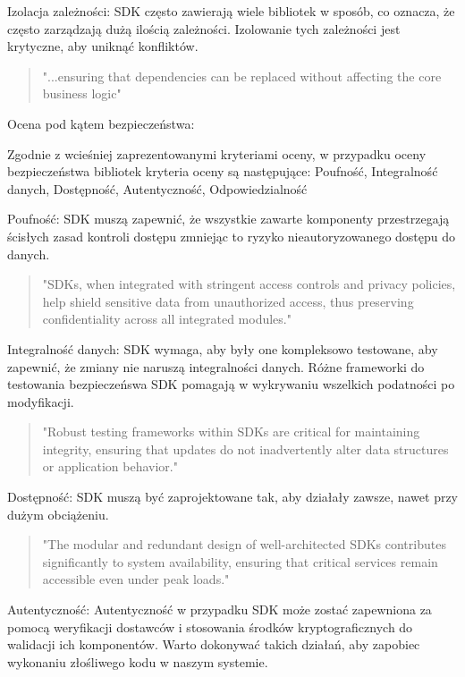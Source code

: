 \documentclass[runningheads,12pt]{llncs}
\begin{document}
Izolacja zależności: SDK często zawierają wiele bibliotek w sposób, co oznacza, że często zarządzają dużą ilością zależności. Izolowanie tych zależności jest krytyczne, aby uniknąć konfliktów.

\begin{quote}
    "...ensuring that dependencies can be replaced without affecting the core business logic" ~\cite[p. 218]{martin2008clean}
\end{quote}
Ocena pod kątem bezpieczeństwa: 

Zgodnie z wcieśniej zaprezentowanymi kryteriami oceny, w przypadku oceny bezpieczeństwa bibliotek kryteria oceny są następujące: Poufność, Integralność danych, Dostępność, Autentyczność, Odpowiedzialność

Poufność: SDK muszą zapewnić, że wszystkie zawarte komponenty przestrzegają ścisłych zasad kontroli dostępu zmniejąc to ryzyko nieautoryzowanego dostępu do danych.

\begin{quote}
    "SDKs, when integrated with stringent access controls and privacy policies, help shield sensitive data from unauthorized access, thus preserving confidentiality across all integrated modules." ~\cite[para 4]{azure2020}
\end{quote}

Integralność danych: SDK wymaga, aby były one kompleksowo testowane, aby zapewnić, że zmiany nie naruszą integralności danych. Różne frameworki do testowania bezpieczeńswa SDK pomagają w wykrywaniu wszelkich podatności po modyfikacji.

\begin{quote}
    "Robust testing frameworks within SDKs are critical for maintaining integrity, ensuring that updates do not inadvertently alter data structures or application behavior." ~\cite[para 5]{azure2020}
\end{quote}

Dostępność: SDK muszą być zaprojektowane tak, aby działały zawsze, nawet przy dużym obciążeniu.

\begin{quote}
    "The modular and redundant design of well-architected SDKs contributes significantly to system availability, ensuring that critical services remain accessible even under peak loads." ~\cite[para 6]{azure2020}
\end{quote}

Autentyczność: Autentyczność w przypadku SDK może zostać zapewniona za pomocą weryfikacji dostawców i stosowania środków kryptograficznych do walidacji ich komponentów. Warto dokonywać takich działań, aby zapobiec wykonaniu złośliwego kodu w naszym systemie.
\end{document}
